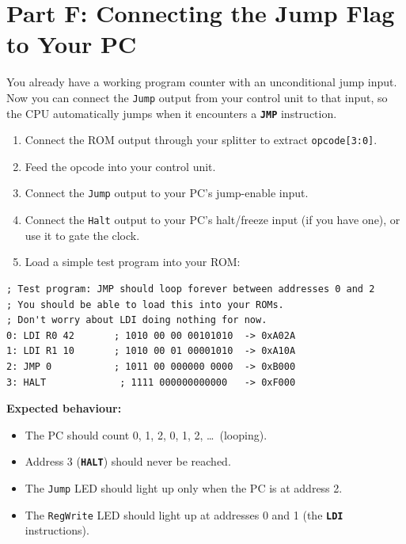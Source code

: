 \documentclass[11pt,a4paper]{article}
\newcommand{\instr}[1]{\texttt{\textbf{#1}}}
\newcommand{\flag}[1]{\texttt{#1}}
\begin{document}
\section{Part F: Connecting the Jump Flag to Your PC}

You already have a working program counter with an unconditional jump input.
Now you can connect the \flag{Jump} output from your control unit to that input, so the CPU automatically jumps when it encounters a \instr{JMP} instruction.

\begin{taskbox}
\begin{enumerate}[leftmargin=2em]
  \item Connect the ROM output through your splitter to extract \texttt{opcode[3:0]}.
  \item Feed the opcode into your control unit.
  \item Connect the \flag{Jump} output to your PC's jump-enable input.
  \item Connect the \flag{Halt} output to your PC's halt/freeze input (if you have one), or use it to gate the clock.
  \item Load a simple test program into your ROM:
\end{enumerate}

\begin{lstlisting}
; Test program: JMP should loop forever between addresses 0 and 2
; You should be able to load this into your ROMs. 
; Don't worry about LDI doing nothing for now.
0: LDI R0 42       ; 1010 00 00 00101010  -> 0xA02A
1: LDI R1 10       ; 1010 00 01 00001010  -> 0xA10A
2: JMP 0           ; 1011 00 000000 0000  -> 0xB000
3: HALT             ; 1111 000000000000   -> 0xF000
\end{lstlisting}

\noindent \textbf{Expected behaviour:}
\begin{itemize}[leftmargin=2em]
  \item The PC should count 0, 1, 2, 0, 1, 2, \ldots\ (looping).
  \item Address 3 (\instr{HALT}) should never be reached.
  \item The \flag{Jump} LED should light up only when the PC is at address 2.
  \item The \flag{RegWrite} LED should light up at addresses 0 and 1 (the \instr{LDI} instructions).
\end{itemize}
\end{taskbox}
\end{document}
